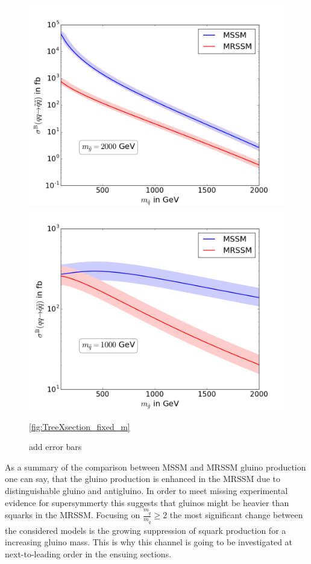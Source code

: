 \begin{figure}[!htpb]
\begin{center}
\includegraphics[scale=.5]{figures/MSSM+MRSSM_msg=2000}
\includegraphics[scale=.5]{figures/MSSM+MRSSM_msq=1000}
\caption{add error bars}\ref{fig:TreeXsection_fixed_m}
\end{center}
\end{figure}
As a summary of the comparison between MSSM and MRSSM gluino production one can say, that the gluino production is enhanced in the MRSSM due to distinguishable gluino and antigluino. In order to meet missing experimental evidence for supersymmerty this suggests that gluinos might be heavier than squarks in the MRSSM. Focusing on $\frac{m_{\tilde{g}}}{m_{\tilde{q}}} \geq 2$ the most significant change between the considered models is the growing suppression of squark production for a increasing gluino mass. This is why this channel is going to be investigated at next-to-leading order in the ensuing sections.